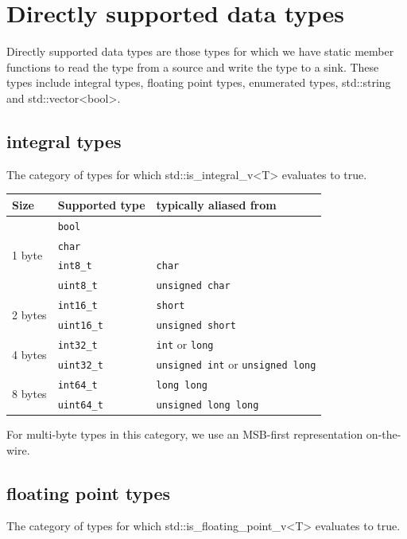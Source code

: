 \chapter{Directly supported data types}\label{ch:dsdt}
Directly supported data types are those types for which we have static
member functions to read the type from a source and write the type to
a sink.  These types include integral types, floating point types,
enumerated types, {\ttfamily std::string} and
{\ttfamily std::vector<bool>}.

\section{integral types}

The category of types for which {\ttfamily std::is\_integral\_v<T>}
evaluates to {\ttfamily true}.

\begin{tabular}{lll}
  \textbf{Size} & \textbf{Supported type} & \textbf{typically aliased from} \\ \hline
  \multirow{4}{*}{1 byte} & \texttt{bool} & \\
  & \texttt{char}      & \\
  & \texttt{int8\_t}   & \texttt{char} \\
  & \texttt{uint8\_t}  & \texttt{unsigned char} \\ \hline
  \multirow{2}{*}{2 bytes} & \texttt{int16\_t}  & \texttt{short} \\
  & \texttt{uint16\_t} & \texttt{unsigned short} \\ \hline
  \multirow{2}{*}{4 bytes} & \texttt{int32\_t}  & \texttt{int} or \texttt{long} \\
  & \texttt{uint32\_t} & \texttt{unsigned int} or \texttt{unsigned long} \\ \hline
  \multirow{2}{*}{8 bytes} & \texttt{int64\_t}  & \texttt{long long} \\
  & \texttt{uint64\_t} & \texttt{unsigned long long} \\
\end{tabular}

For multi-byte types in this category, we use an MSB-first representation
on-the-wire.

\section{floating point types}

The category of types for which {\ttfamily std::is\_floating\_point\_v<T>}
evaluates to {\ttfamily true}.

